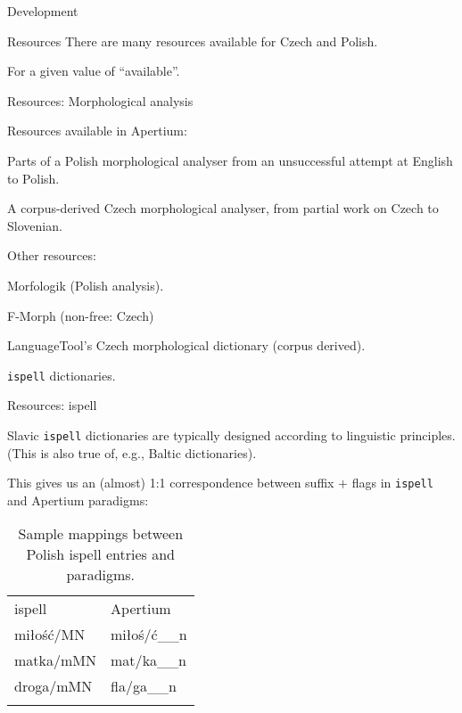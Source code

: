 \documentclass{beamer}
\begin{document}
\begin{section}{Development}
\begin{frame}{Resources}
There are many resources available for Czech and Polish.

\pause

For a given value of ``available''.

\end{frame}
\begin{frame}{Resources: Morphological analysis}

Resources available in Apertium:

Parts of a Polish morphological analyser from an unsuccessful attempt at 
English to Polish.

A corpus-derived Czech morphological analyser, from partial work on Czech to Slovenian.

Other resources:

Morfologik (Polish analysis).

F-Morph (non-free: Czech)

LanguageTool's Czech morphological dictionary (corpus derived).

\texttt{ispell} dictionaries.
\end{frame}

\begin{frame}{Resources: ispell}

Slavic \texttt{ispell} dictionaries are typically designed according to 
linguistic principles. (This is also true of, e.g., Baltic dictionaries).

This gives us an (almost) 1:1 correspondence between suffix $+$ flags in
\texttt{ispell} and Apertium paradigms:

\begin{table}
\begin{center}
 \caption{Sample mappings between Polish ispell entries and paradigms.}
 \begin{tabular}{ll}
    \hline\noalign{\smallskip}
    ispell      & Apertium\\
    \noalign{\smallskip}\hline\noalign{\smallskip}
    miłość$/$MN & miłoś$/$ć\_\_n\\
    matka$/$mMN & mat$/$ka\_\_n\\
    droga$/$mMN & fla$/$ga\_\_n\\
    \hline\noalign{\smallskip}
 \end{tabular}
\end{center}
\end{table}
\end{frame}


\end{section}
\end{document}
